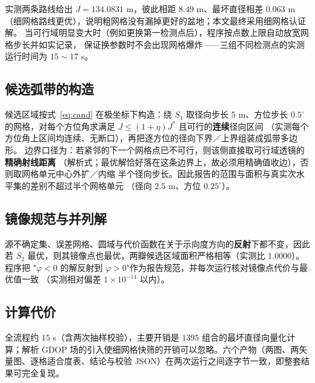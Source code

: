 实测两条路线给出 $J=134.0831$ m，彼此相距 $8.49$ m、最坏直径相差 $0.063$ m
（细网格路线更优），说明粗网格没有漏掉更好的盆地；本文最终采用细网格认证解。
当可行域明显变大时（例如更换第一检测点后），程序按点数上限自动放宽网格步长并如实记录，
保证换参数时不会出现网格爆炸——三组不同检测点的实测运行时间为 $15\sim17$ s。

\subsection{候选弧带的构造}

候选区域按式~\eqref{eq:cand} 在极坐标下构造：绕 $S_1$ 取径向步长 $5$ m、方位步长
$0.5^\circ$ 的网格，对每个方位角求满足 $J\le(1+\eta)J^*$ 且可行的\textbf{连续}径向区间
（实测每个方位角上区间均连续、无断口），再把逐方位的径向下界／上界组装成弧带多边形。
边界口径为：若紧邻的下一个网格点已不可行，则该侧直接取可行域透镜的\textbf{精确射线距离}
（解析式；最优解恰好落在这条边界上，故必须用精确值收边），否则取网格单元中心外扩／内缩
半个径向步长。因此报告的范围与面积与真实次水平集的差别不超过半个网格单元
（径向 $2.5$ m、方位 $0.25^\circ$）。

\subsection{镜像规范与并列解}

源不确定集、误差网格、圆域与代价函数在关于示向度方向的\textbf{反射}下都不变，因此若
$S_2$ 最优，则其镜像点也最优，两瓣候选区域面积严格相等（实测比 $1.0000$）。程序把
"$\varphi<0$ 的解反射到 $\varphi>0$"作为报告规范，并每次运行核对镜像点代价与最优值一致
（实测相对偏差 $1\times10^{-14}$ 以内）。

\subsection{计算代价}

全流程约 $15$ s（含两次抽样校验），主要开销是 $1395$ 组合的最坏直径向量化计算；解析 GDOP
场的引入使细网格快筛的开销可以忽略。六个产物（两图、两矢量图、逐格适合度表、结论与校验
JSON）在两次运行之间逐字节一致，即整套结果可完全复现。
